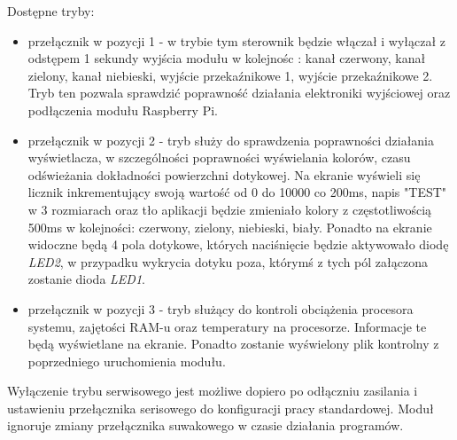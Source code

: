 \documentclass[12pt, eng, twoside, openany, final]{mgr}
\begin{document}
            Dostępne tryby:
            \begin{itemize}
                \item przełącznik w pozycji 1 - w trybie tym sterownik będzie włączał i wyłączał z odstępem 1 sekundy wyjścia modułu w kolejnośc : kanał czerwony, kanał zielony, kanał niebieski, wyjście przekaźnikowe 1, wyjście przekaźnikowe 2. Tryb ten pozwala sprawdzić poprawność działania elektroniki wyjściowej oraz podłączenia modułu Raspberry Pi.
                
                \item przełącznik w pozycji 2 - tryb służy do sprawdzenia poprawności działania wyświetlacza, w szczególności poprawności wyświelania kolorów, czasu odświeżania dokładności powierzchni dotykowej.
                Na ekranie wyświeli się licznik inkrementujący swoją wartość od 0 do 10000 co 200ms, napis "TEST" w 3 rozmiarach oraz tło aplikacji będzie zmieniało kolory z częstotliwością 500ms w kolejności: czerwony, zielony, niebieski, biały. Ponadto na ekranie widoczne będą 4 pola dotykowe, których naciśnięcie będzie aktywowało diodę \emph{LED2}, w przypadku wykrycia dotyku poza, którymś z tych pól załączona zostanie dioda \emph{LED1}. 
                
                \item przełącznik w pozycji 3 - tryb służący do kontroli obciążenia procesora systemu, zajętości RAM-u oraz temperatury na procesorze. Informacje te będą wyświetlane na ekranie. Ponadto zostanie wyświelony plik kontrolny z poprzedniego uruchomienia modułu.
            \end{itemize}
            
            Wyłączenie trybu serwisowego jest możliwe dopiero po odłączniu zasilania i ustawieniu przełącznika serisowego do konfiguracji pracy standardowej.
            Moduł ignoruje zmiany przełącznika suwakowego w czasie działania programów.
            
            \newpage
            
\end{document}
